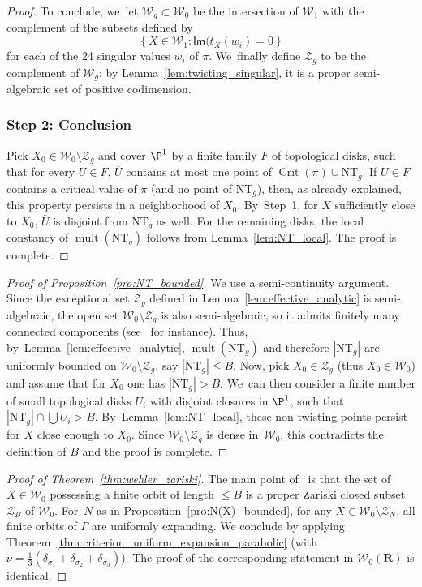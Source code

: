 \documentclass[JEP,XML,SOM,Unicode,published]{cedram}
\let\sep :
\newcommand{\set}[1]{\left\{#1\right\}}
\newcommand{\abs}[1]{\left\vert#1\right\vert}
\newcommand{\unsur}[1]{\frac{1}{#1}}
\DeclareMathOperator{\mult}{mult}
\DeclareMathOperator{\Crit}{Crit}
\def\R{\mathbf{R}}
\newcommand{\cW}{\mathcal{W}}
\newcommand{\NT}{{\mathrm{NT}}}
\newcommand{\Ima}{{\mathsf{Im}}}
\theoremstyle{plain}
\theoremstyle{definition}
\begin{document}
\begin{proof}
To conclude, we~let $ \cW_g\subset \cW_0$ be
the intersection of $ \cW_1$ with the complement of the subsets defined by
\begin{equation*}
\set{X\in \cW_1\sep \Ima(t_X(w_i) = 0}
\end{equation*} for each of the 24 singular values $w_i$ of $\pi$. We~finally define $\mathcal Z_g$ to be the complement of $ \cW_g$; by Lemma~\ref{lem:twisting_singular}, it is a proper
semi-algebraic set of positive codimension.

\subsubsection*{Step 2: Conclusion}
Pick $X_0\in \cW_0\setminus \mathcal Z_g$ and cover $\P^1$ by a finite family $F$ of
topological disks, such that for every $U\in F$,
$\overline U$ contains at most one point of $\Crit(\pi)\cup \NT_g$.
If $U\in F$ contains a critical value of $\pi$ (and no point of $\NT_g$),
then, as already explained, this property persists in a neighborhood of $X_0$. By~Step~1, for
$X$ sufficiently
close to $X_0$, $\overline U$ is disjoint from $\NT_g$ as well. For the remaining disks, the local constancy of $\mult(\NT_g)$ follows from Lemma~\ref{lem:NT_local}. The proof is complete.
\end{proof}

\begin{proof}[Proof of Proposition~\ref{pro:NT_bounded}]
We use a semi-continuity argument.
Since the exceptional set $\mathcal Z_g$ defined in Lemma~\ref{lem:effective_analytic} is semi-algebraic,
the open set $\cW_0\setminus \mathcal Z_g$ is also semi-algebraic, so it
admits finitely many connected components (see~\cite[Cor.\,2.7]{bierstone-milman:ihes} for instance).
Thus, by~Lemma~\ref{lem:effective_analytic}, $\mult(\NT_g)$ and therefore $\abs{\NT_g}$
are uniformly bounded
on $\cW_0\setminus \mathcal Z_g$, say $\abs{\NT_g}\leq B$. Now, pick $X_0\in \mathcal Z_g$ (thus $X_0\in \cW_0$) and assume
that for $X_0$ one has $\abs{\NT_g}>B$. We~can then consider a finite number of small topological
disks $U_i$ with disjoint closures in $\P^1$, such that $\abs{\NT_g}\cap \bigcup U_i>B$. By~Lemma~\ref{lem:NT_local}, these non-twisting points persist for
$X$ close enough to $X_0$. Since $\cW_0\setminus \mathcal Z_g$ is dense in~$\cW_0$, this
contradicts the definition of $B$ and the proof is complete.
\end{proof}

\begin{proof}[Proof of Theorem~\ref{thm:wehler_zariski}]
The main point of~\cite[Th.\,A]{finite_orbits} is
that the set of $X\in \cW_0$ possessing a finite orbit of length $\leq B$ is a
proper Zariski closed subset $\mathcal Z_B$ of $ \cW_0$. For~$N$ as in
Proposition~\ref{pro:N(X)_bounded}, for
any $X\in \cW_0\setminus \mathcal Z_N$, all finite orbits of $\Gamma$ are uniformly expanding. We
conclude by applying Theorem~\ref{thm:criterion_uniform_expansion_parabolic} (with $\nu = \unsur{3}(\delta_{\sigma_1}+ \delta_{\sigma_2}+\delta_{\sigma_3})$). The proof of the corresponding statement in $ \cW_0(\R)$ is identical.
\end{proof}
\end{document}
